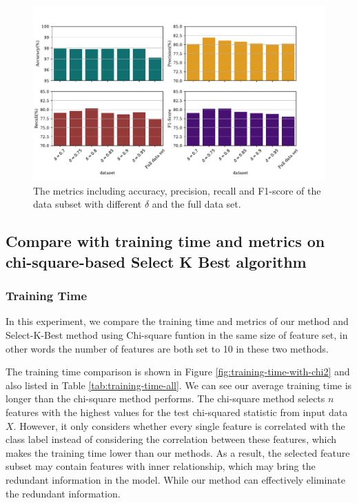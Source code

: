 \documentclass{ieeeaccess}
\theoremstyle{definition}
\begin{document}
\begin{figure}[!htpb]
    \centering
    \includegraphics[scale=0.35]{fig/metrics-full.pdf}
    \caption{The metrics including accuracy, precision, recall and F1-score of the data subset with different $\delta$ and the full data set.}
    \label{fig:metrics-full}
\end{figure}

\subsection{Compare with training time and metrics on chi-square-based Select K Best algorithm}

\subsubsection{Training Time}

In this experiment, we compare the training time and metrics of our method and Select-K-Best method using Chi-square funtion in the same size of feature set, in other words the number of features are both set to 10 in these two methods.

The training time comparison is shown in Figure \ref{fig:training-time-with-chi2} and also listed in Table \ref{tab:training-time-all}. We can see our average training time is longer than the chi-square method performs. The chi-square method selects $n$ features with the highest values for the test chi-squared statistic from input data $X$. However, it only considers whether every single feature is correlated with the class label instead of considering the correlation between these features, which makes the training time lower than our methods. 
As a result, the selected feature subset may contain features with inner relationship, which may bring the redundant information in the model. While our method can effectively eliminate the redundant information. 
\end{document}
